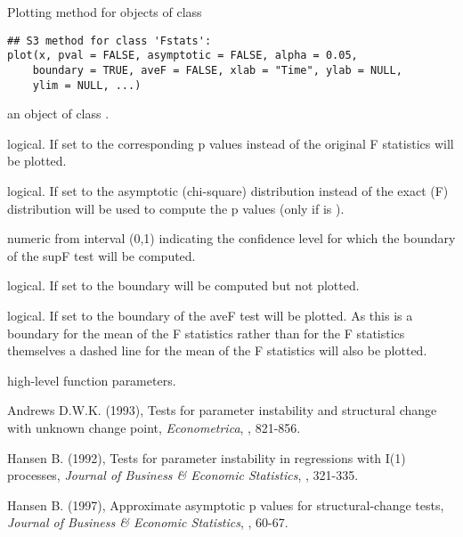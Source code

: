 \begin{Description}\relax
Plotting method for objects of class \end{Description}
\begin{Usage}
\begin{verbatim}
## S3 method for class 'Fstats':
plot(x, pval = FALSE, asymptotic = FALSE, alpha = 0.05,
    boundary = TRUE, aveF = FALSE, xlab = "Time", ylab = NULL,
    ylim = NULL, ...)
\end{verbatim}
\end{Usage}
\begin{Arguments}
\begin{ldescription}
\item[\code{x}] an object of class .
\item[\code{pval}] logical. If set to  the corresponding p values instead
of the original F statistics will be plotted.
\item[\code{asymptotic}] logical. If set to  the asymptotic (chi-square)
distribution instead of the exact (F) distribution will be used to compute
the p values (only if  is ).
\item[\code{alpha}] numeric from interval (0,1) indicating the confidence level for
which the boundary of the supF test will be computed.
\item[\code{boundary}] logical. If set to  the boundary will be computed
but not plotted.
\item[\code{aveF}] logical. If set to  the boundary of the aveF test will
be plotted. As this is a boundary for the mean of the F statistics rather
than for the F statistics themselves a dashed line for the mean of the F
statistics will also be plotted.
\item[\code{xlab, ylab, ylim, ...}] high-level  function parameters.
\end{ldescription}
\end{Arguments}
\begin{References}\relax
Andrews D.W.K. (1993), Tests for parameter instability and structural
change with unknown change point, \emph{Econometrica}, , 821-856.

Hansen B. (1992), Tests for parameter instability in regressions with I(1)
processes, \emph{Journal of Business \& Economic Statistics}, , 321-335.

Hansen B. (1997), Approximate asymptotic p values for structural-change
tests, \emph{Journal of Business \& Economic Statistics}, , 60-67.\end{References}
